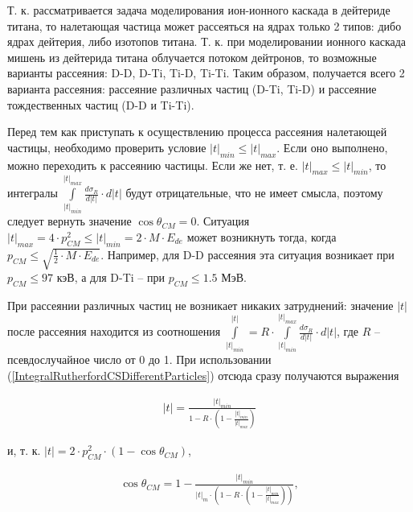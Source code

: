 \documentclass[a4paper,12pt]{article}
\begin{document}
\begin{large}
	Т. к. рассматривается задача моделирования ион-ионного каскада в дейтериде титана, то налетающая частица может рассеяться на ядрах только 2 типов: дибо ядрах дейтерия, либо изотопов титана.
	Т. к. при моделировании ионного каскада мишень из дейтерида титана облучается потоком дейтронов, то возможные варианты рассеяния: D-D, D-Ti, Ti-D, Ti-Ti.
	Таким образом, получается всего 2 варианта рассеяния: рассеяние различных частиц (D-Ti, Ti-D) и рассеяние тождественных частиц (D-D и Ti-Ti).
	
	Перед тем как приступать к осуществлению процесса рассеяния налетающей частицы, необходимо проверить условие $|t|_{min} \leq |t|_{max}$.
	Если оно выполнено, можно переходить к рассеянию частицы.
	Если же нет, т. е. $|t|_{max} \leq |t|_{min}$, то интегралы $\int \limits^{|t|_{max}}_{|t|_{min}} \frac{d\sigma_R}{d|t|} \cdot d|t|$ будут отрицательные, что не имеет смысла, поэтому следует вернуть значение $\cos{\theta_{CM}}=0$.
	Ситуация $|t|_{max}=4\cdot p^2_{CM} \leq |t|_{min}=2\cdot M \cdot E_{de}$ может возникнуть тогда, когда $p_{CM} \leq \sqrt{ \frac{1}{2} \cdot M \cdot E_{de} }$.
	Например, для D-D рассеяния эта ситуация возникает при $p_{CM} \leq 97$ кэВ, а для D-Ti -- при $p_{CM} \leq 1.5$ МэВ.
	
	При рассеянии различных частиц не возникает никаких затруднений: значение $|t|$ после рассеяния находится из соотношения $\int \limits^{|t|}_{|t|_{min}}=R \cdot \int \limits^{|t|_{max}}_{|t|_{min}} \frac{d\sigma_R}{d|t|} \cdot d|t|$, где $R$ -- псевдослучайное число от 0 до 1.
	При использовании (\ref{IntegralRutherfordCSDifferentParticles}) отсюда сразу получаются выражения
	
\begin{equation}
\label{TDifferentParticles}
\begin{aligned} 
   |t| = \frac{|t|_{min}}{1-R\cdot \left( 1-\frac{|t|_{min}}{|t|_{max}} \right)} 
\end{aligned}
\end{equation}

	и, т. к. $|t|=2\cdot p^2_{CM} \cdot \left( 1-\cos{\theta_{CM}} \right)$,
	
\begin{equation}
\label{CosThetCMDifferentParticles}
\begin{aligned} 
  \cos{ \theta_{CM}} = 1- \frac{|t|_{min}}{|t|_m \cdot \left( 1-R\cdot \left( 1-\frac{|t|_{min}}{|t|_{max}} \right) \right)},
\end{aligned}
\end{equation}


\end{large}
\end{document}
